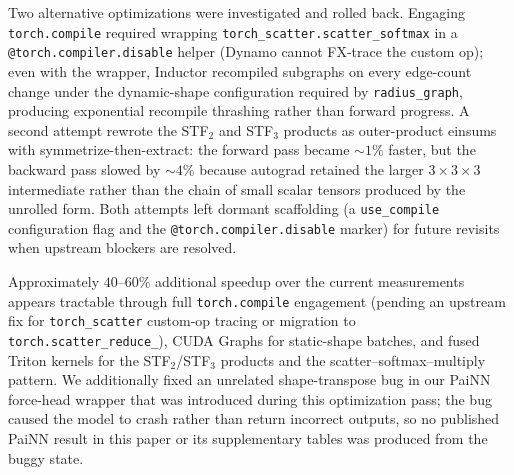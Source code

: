 Two alternative optimizations were investigated and rolled back. Engaging \texttt{torch.compile} required wrapping \texttt{torch\_scatter.scatter\_softmax} in a \texttt{@torch.compiler.disable} helper (Dynamo cannot FX-trace the custom op); even with the wrapper, Inductor recompiled subgraphs on every edge-count change under the dynamic-shape configuration required by \texttt{radius\_graph}, producing exponential recompile thrashing rather than forward progress. A second attempt rewrote the STF$_2$ and STF$_3$ products as outer-product einsums with symmetrize-then-extract: the forward pass became $\sim\!1\%$ faster, but the backward pass slowed by $\sim\!4\%$ because autograd retained the larger $3\times 3\times 3$ intermediate rather than the chain of small scalar tensors produced by the unrolled form. Both attempts left dormant scaffolding (a \texttt{use\_compile} configuration flag and the \texttt{@torch.compiler.disable} marker) for future revisits when upstream blockers are resolved.

Approximately $40$--$60\%$ additional speedup over the current measurements appears tractable through full \texttt{torch.compile} engagement (pending an upstream fix for \texttt{torch\_scatter} custom-op tracing or migration to \texttt{torch.scatter\_reduce\_}), CUDA Graphs for static-shape batches, and fused Triton kernels for the STF$_2$/STF$_3$ products and the scatter--softmax--multiply pattern. We additionally fixed an unrelated shape-transpose bug in our PaiNN force-head wrapper that was introduced during this optimization pass; the bug caused the model to crash rather than return incorrect outputs, so no published PaiNN result in this paper or its supplementary tables was produced from the buggy state.
